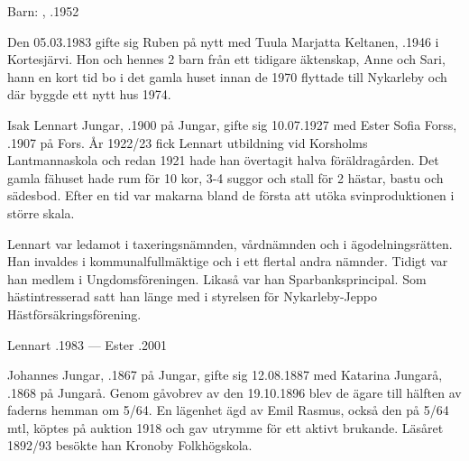 Barn: , .1952

Den 05.03.1983 gifte sig Ruben på nytt med Tuula Marjatta Keltanen, .1946 i Kortesjärvi. Hon och hennes 2 barn från ett tidigare äktenskap, Anne och Sari, hann en kort tid bo i det gamla huset innan de 1970 flyttade till Nykarleby och där byggde ett nytt hus 1974.


Isak Lennart Jungar, .1900 på Jungar, gifte sig 10.07.1927 med Ester Sofia Forss, .1907 på Fors. År 1922/23 fick Lennart utbildning vid Korsholms Lantmannaskola och redan 1921 hade han övertagit halva föräldragården. Det gamla fähuset hade rum för 10 kor, 3-4 suggor och stall för 2 hästar, bastu och sädesbod. Efter en tid var makarna bland de första att utöka svinproduktionen i större  skala.

Lennart var ledamot i taxeringsnämnden, vårdnämnden och i ägodelningsrätten. Han invaldes i kommunalfullmäktige och i ett
flertal andra nämnder. Tidigt var han medlem i Ungdomsföreningen. Likaså var han Sparbanksprincipal. Som hästintresserad satt han länge med i styrelsen för Nykarleby-Jeppo Hästförsäkringsförening.
\begin{jhchildren}
  \item {}
  \item {}
  \item {}
  \item {}
\end{jhchildren}

Lennart .1983  ---  Ester .2001


Johannes Jungar, .1867 på Jungar, gifte sig 12.08.1887 med Katarina Jungarå, .1868 på Jungarå. Genom gåvobrev av den 19.10.1896 blev de ägare till hälften av faderns hemman om 5/64. En lägenhet ägd av Emil Rasmus, också den på 5/64 mtl, köptes på auktion 1918 och gav utrymme för ett aktivt brukande. Läsåret 1892/93 besökte han Kronoby Folkhögskola.

